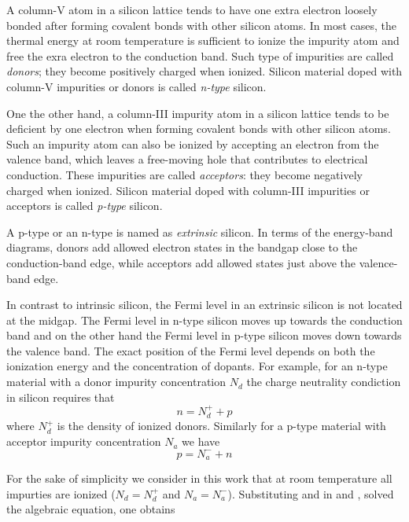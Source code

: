A column-V atom in a silicon lattice tends to have one extra electron loosely bonded after forming covalent bonds with other silicon atoms. In most cases, the thermal energy at room temperature is sufficient to ionize the impurity atom and free the exra electron to the conduction band. Such type of impurities are called \textit{donors}; they become positively charged when ionized. Silicon material doped with column-V impurities or donors is called \textit{n-type} silicon.

One the other hand, a column-III impurity atom in a silicon lattice tends to be deficient by one electron when forming covalent bonds with other silicon atoms. Such an impurity atom can also be ionized by accepting an electron from the valence band, which leaves a free-moving hole that contributes to electrical conduction. These impurities are called \textit{acceptors}: they become negatively charged when ionized. Silicon material doped with column-III impurities or acceptors is called \textit{p-type} silicon.

A p-type or an n-type is named as \textit{extrinsic} silicon.
In terms of the energy-band diagrams, donors add allowed electron states in the bandgap close to the conduction-band edge, while acceptors add allowed states just above the valence-band edge.

In contrast to intrinsic silicon, the Fermi level in an extrinsic silicon is not located at the midgap. The Fermi level in n-type silicon moves up towards the conduction band and on the other hand the Fermi level in p-type silicon moves down towards the valence band.
The exact position of the Fermi level depends on both the ionization energy and the concentration of dopants. For example, for an n-type material with a donor impurity concentration $N_d$ the charge neutrality condiction in silicon requires that
\begin{equation}
\label{eq: equilibrium charge in n-type}
n = N_d^+ + p
\end{equation}
 where $N_d^+$ is the density of ionized donors.  Similarly for a p-type material with acceptor impurity concentration $N_a$ we have
\begin{equation}
\label{eq: equilibrium charge in p-type}
p = N_a^- + n
\end{equation}
 
 For the sake of simplicity we consider in this work that at room temperature all impurties are ionized ($N_d = N_d^+$ and $N_a = N_a^-$).
 Substituting  and  in  and , solved the algebraic equation, one obtains
 
